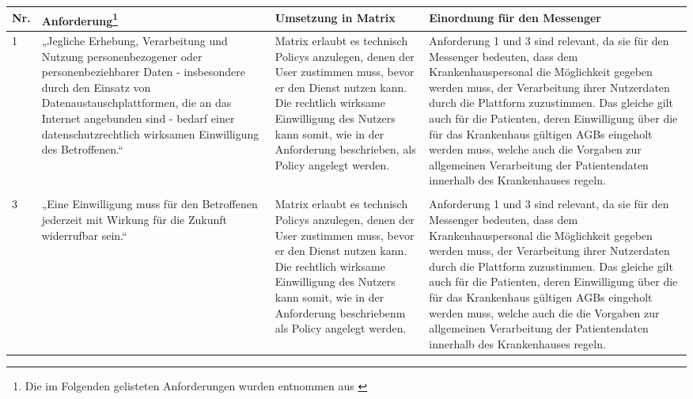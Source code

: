 \begin{longtable}{p{0.6cm}|p{4cm}|p{5cm}|p{5cm}}
    \hline
Nr. & Anforderung\footnote{Die im Folgenden gelisteten Anforderungen wurden entnommen aus \cite[S. 41 ff.]{Bundesverband-Gesundheits-IT-e.V.2016}}                                                                                                                                                                                                                                                                                          & Umsetzung in Matrix          & Einordnung für den Messenger                                                                                                                                                                                                                                                                                                                                                                                                                                                                                                                                        \\ \hline
1 &
  „Jegliche Erhebung, Verarbeitung und Nutzung personenbezogener oder personenbeziehbarer Daten - insbesondere durch den Einsatz von Datenaustauschplattformen, die an das Internet angebunden sind - bedarf einer datenschutzrechtlich wirksamen Einwilligung des Betroffenen.“ &
  Matrix erlaubt es technisch Policys anzulegen, denen der User zustimmen muss, bevor er den Dienst nutzen kann. Die rechtlich wirksame Einwilligung des Nutzers kann somit, wie in der Anforderung beschrieben, als Policy angelegt werden. &
  Anforderung 1 und 3 sind relevant, da sie für den Messenger bedeuten, dass dem Krankenhauspersonal die Möglichkeit gegeben werden muss, der Verarbeitung ihrer Nutzerdaten durch die Plattform zuzustimmen. Das gleiche gilt auch für die Patienten, deren Einwilligung über die für das Krankenhaus gültigen AGBs eingeholt werden muss, welche auch die Vorgaben zur allgemeinen Verarbeitung der Patientendaten innerhalb des Krankenhauses regeln. \\
  \\ \hline
  3 &
  „Eine Einwilligung muss für den Betroffenen jederzeit mit Wirkung für die Zukunft widerrufbar sein.“ &
  Matrix erlaubt es technisch Policys anzulegen, denen der User zustimmen muss, bevor er den Dienst nutzen kann. Die rechtlich wirksame Einwilligung des Nutzers kann somit, wie in der Anforderung beschriebenm als Policy angelegt werden. &
  Anforderung 1 und 3 sind relevant, da sie für den Messenger bedeuten, dass dem Krankenhauspersonal die Möglichkeit gegeben werden muss, der Verarbeitung ihrer Nutzerdaten durch die Plattform zuzustimmen. Das gleiche gilt auch für die Patienten, deren Einwilligung über die für das Krankenhaus gültigen AGBs eingeholt werden muss, welche auch die die Vorgaben zur allgemeinen Verarbeitung der Patientendaten innerhalb des Krankenhauses regeln. \\

\end{longtable}
